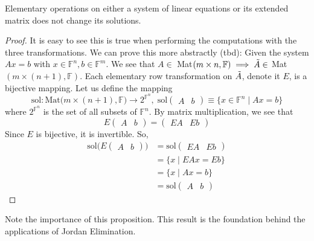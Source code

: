\documentclass{article}
\begin{document}
    \begin{proposition}
    Elementary operations on either a system of linear equations or its extended matrix does not change its solutions. 
    \end{proposition}

    \begin{proof}
    It is easy to see this is true when performing the computations with the three transformations. We can prove this more abstractly (tbd): Given the system $A x = b$ with $x \in \mathbb{F}^n, b \in \mathbb{F}^m$. We see that $A \in $ Mat$(m \times n, \mathbb{F}) \implies \Tilde{A} \in$ Mat$(m \times (n+1), \mathbb{F})$. Each elementary row transformation on $\Tilde{A}$, denote it $E$, is a bijective mapping. Let us define the mapping 
    \[\text{sol}: \text{Mat}\big( m \times (n+1), \mathbb{F} \big) \longrightarrow 2^{\mathbb{F}^n}, \; \text{sol} \begin{pmatrix}
    A & b
    \end{pmatrix} \equiv \{ x\in \mathbb{F}^n \; | \; A x = b\} \]
    where $2^{\mathbb{F}^n}$ is the set of all subsets of $\mathbb{F}^n$. By matrix multiplication, we see that 
    \[ E \begin{pmatrix}
    A & b
    \end{pmatrix} = \begin{pmatrix}
    E A & E b
    \end{pmatrix}\]
    Since $E$ is bijective, it is invertible. So, 
    \begin{align*} 
    \text{sol} \big( E \begin{pmatrix}
    A & b \end{pmatrix} \big) & = \text{sol} \begin{pmatrix}
    E A & E b \end{pmatrix} \\ 
    & = \{ x \; | \; E A x = E b\} \\ 
    & = \{ x \; | \; A x = b\} \\ 
    & = \text{sol} \begin{pmatrix} A & b \end{pmatrix}
    \end{align*}
    \end{proof}

    Note the importance of this proposition. This result is the foundation behind the applications of Jordan Elimination.
\end{document}
